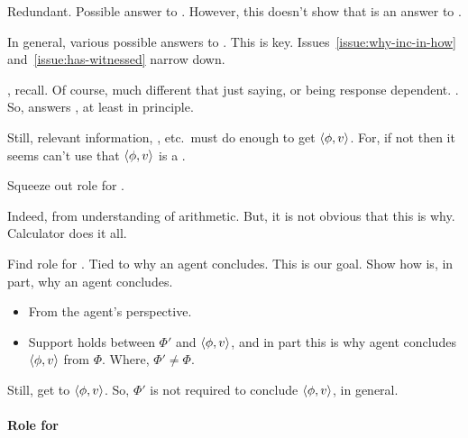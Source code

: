 \begin{note}[Major]
  Redundant.
  Possible answer to \qWhy{}.
  However, this doesn't show that is an answer to \qWhy{}.

  In general, various possible answers to \qWhy{}.
  This is key.
  Issues~\ref{issue:why-inc-in-how} and~\ref{issue:has-witnessed} narrow down.

  \citeauthor{Boghossian:2014aa}, recall.
  Of course, much different that just saying, or being response dependent.
  .
  So, answers \qWhy{}, at least in principle.

  Still, relevant information, \itp{}, etc.\ must do enough to get \(\langle \phi, v \rangle\).
  For, if not then it seems can't use that \(\langle \phi, v \rangle\) is a .

  Squeeze out role for .

  Indeed,  from understanding of arithmetic.
  But, it is not obvious that this is why.
  Calculator does it all.

  Find role for .
  Tied to why an agent concludes.
  This is our goal.
  Show how  is, in part, why an agent concludes.

  \begin{itemize}
  \item
    From the agent's perspective.
  \item
    Support holds between \(\Phi'\) and \(\langle \phi, v \rangle\), and in part this is why agent concludes \(\langle \phi, v \rangle\) from \(\Phi\).
    Where, \(\Phi' \ne \Phi\).
  \end{itemize}

  Still, get to \(\langle \phi, v \rangle\).
  So, \(\Phi'\) is not required to conclude \(\langle \phi, v \rangle\), in general.
\end{note}

\paragraph*{Role for }

